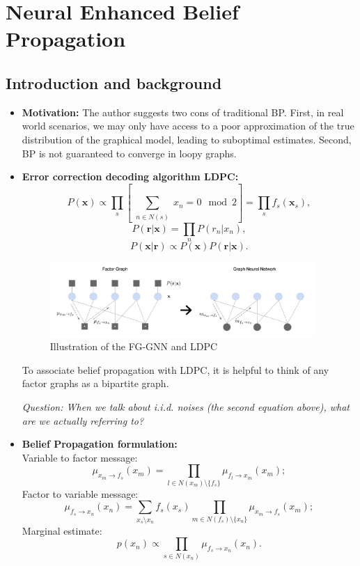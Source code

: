 \documentclass{article}
\begin{document}
\newpage
\section*{Neural Enhanced Belief Propagation}

\subsection*{Introduction and background}
\begin{itemize}
  \item \textbf{Motivation:} The author suggests two cons of traditional BP. First, in real world scenarios, we may only have access to a poor approximation of the true distribution of the graphical model, leading to suboptimal estimates. Second, BP is not guaranteed to converge in loopy graphs.
  \item \textbf{Error correction decoding algorithm LDPC:}
  \[P(\mathbf{x}) \propto \prod_{s} \left[ \sum_{\substack{n \in N(s)}} x_n = 0 \mod 2 \right] = \prod_{s} f_s(\mathbf{x}_s),\]
  \[P(\mathbf{r}|\mathbf{x}) = \prod_{n} P(r_n | x_n),\]
  \[P(\mathbf{x} | \mathbf{r}) \propto P(\mathbf{x}) P(\mathbf{r} | \mathbf{x}).\]
  \begin{figure}[htb]
    \centering
    \includegraphics[width=0.95\textwidth]{FGGNN_illustration.png}
    \caption{Illustration of the FG-GNN and LDPC}
    \label{fig:fggnn}
  \end{figure}

  To associate belief propagation with LDPC, it is helpful to think of any factor graphs as a bipartite graph.

  \emph{Question: When we talk about i.i.d. noises (the second equation above), what are we actually referring to?}
  \item
  \textbf{Belief Propagation formulation:}\\
  Variable to factor message:
  \[\mu_{x_m \rightarrow f_s}(x_m) = \prod_{l \in N(x_m) \setminus \{f_s\}} \mu_{f_l \rightarrow x_m}(x_m);\]
  Factor to variable message:
  \[\mu_{f_s \rightarrow x_n}(x_n) = \sum_{x_s \setminus x_n} f_s(x_s) \prod_{m \in N(f_s) \setminus \{x_n\}} \mu_{x_m \rightarrow f_s}(x_m);
  \]
  Marginal estimate:
  \[p(x_n) \propto \prod_{s \in N(x_n)} \mu_{f_s \rightarrow x_n}(x_n).\]
  \end{itemize}
\end{document}
